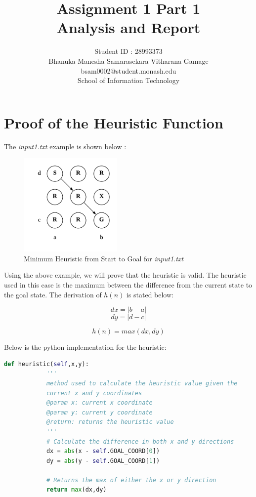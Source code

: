 \documentclass{article}
\title{Assignment 1 Part 1 \\
		Analysis and Report}
\author{Student ID : 28993373\\
	Bhanuka Manesha Samarasekara Vitharana Gamage\\
	bsam0002@student.monash.edu\\
	School of Information Technology}
\begin{document}
	\lstset{language=Python}   
	\maketitle
	
	\section{Proof of the Heuristic Function}
	
	The \emph{input1.txt} example is shown below :
	
	\begin{figure}[!h]
		\centering
		\includegraphics[width=50mm]{img1.png}
		\caption{Minimum Heuristic from Start to Goal for \emph{input1.txt}}
		\label{fig:img1}
	\end{figure}
	
	Using the above example, we will prove that the heuristic is valid. The heuristic used in this case is the maximum between the difference from the current state to the goal state. The derivation of $h(n)$ is stated below:
	
	\begin{equation} 
		dx = | b - a | \label{equation:2}
	\end{equation}
	\begin{equation} 
		dy = | d - c | \label{equation:3}
	\end{equation}
	
	\begin{equation}
		h(n) = max(dx,dy) \label{equation:4}
	\end{equation}
	
			\newpage
	Below is the python implementation for the heuristic:


		\begin{lstlisting}[language=Python]
		def heuristic(self,x,y):
			'''
			method used to calculate the heuristic value given the 
			current x and y coordinates
			@param x: current x coordinate
			@param y: current y coordinate
			@return: returns the heuristic value
			'''
			# Calculate the difference in both x and y directions
			dx = abs(x - self.GOAL_COORD[0])
			dy = abs(y - self.GOAL_COORD[1])
			
			# Returns the max of either the x or y direction
			return max(dx,dy)
		\end{lstlisting}
\end{document}
